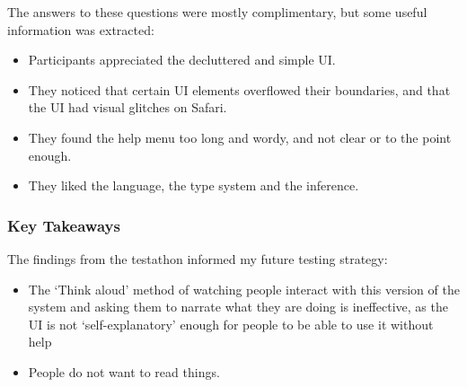 The answers to these questions were mostly complimentary, but some useful information was extracted:
\begin{itemize}
    \item Participants appreciated the decluttered and simple UI. 
    \item They noticed that certain UI elements overflowed their boundaries, and that the UI had visual glitches on Safari.
    \item They found the help menu too long and wordy, and not clear or to the point enough.
    \item They liked the language, the type system and the inference. 
\end{itemize}




\subsubsection{Key Takeaways} The findings from the testathon informed my future testing strategy:
\begin{itemize}
    \item The `Think aloud' method of watching people interact with this version of the system and asking them to narrate what they are doing is ineffective, as the UI is not `self-explanatory' enough for people to be able to use it without help 
    \item People do not want to read things. 
\end{itemize}

